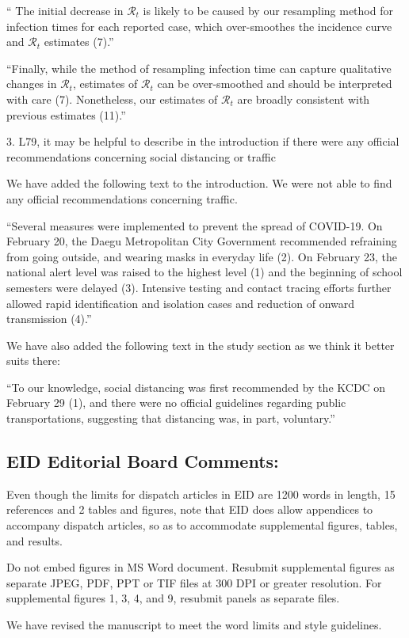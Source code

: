 \documentclass[12pt]{article}
\newcommand{\rev}{\subsection*}
\newcommand{\revtext}{\textsf}
\begin{document}
`` The initial decrease in $\mathcal R_t$ is likely to be caused by our resampling method for infection times for each reported case, which over-smoothes the incidence curve and $\mathcal R_t$ estimates (7).''

``Finally, while the method of resampling infection time can capture qualitative changes in $\mathcal R_t$, estimates of $\mathcal R_t$ can be over-smoothed and should be interpreted with care (7). Nonetheless, our estimates of $\mathcal R_t$ are broadly consistent with previous estimates (11).''

\revtext{3.	L79, it may be helpful to describe in the introduction if there were any official recommendations concerning social distancing or traffic}

We have added the following text to the introduction. We were not able to find any official recommendations concerning traffic.

``Several measures were implemented to prevent the spread of COVID-19. On February 20,
the Daegu Metropolitan City Government recommended refraining from going outside, and
wearing masks in everyday life (2). On February 23, the national alert level was raised to the
highest level (1) and the beginning of school semesters were delayed (3). Intensive testing and
contact tracing efforts further allowed rapid identification and isolation cases and reduction of
onward transmission (4).''

We have also added the following text in the study section as we think it better suits there:

``To our knowledge, social distancing was first recommended by the KCDC on February 29 (1), and there were no official guidelines regarding public transportations, suggesting that distancing was, in part, voluntary.''

\rev{EID Editorial Board Comments:}

\revtext{Even though the limits for dispatch articles in EID are 1200 words in length, 15 references and 2 tables and figures, note that EID does allow appendices to accompany dispatch articles, so as to accommodate supplemental figures, tables, and results.}

\revtext{Do not embed figures in MS Word document. Resubmit supplemental figures as separate JPEG, PDF, PPT or TIF files at 300 DPI or greater resolution. For supplemental figures 1, 3, 4, and 9, resubmit panels as separate files.}

We have revised the manuscript to meet the word limits and style guidelines.
\end{document}

